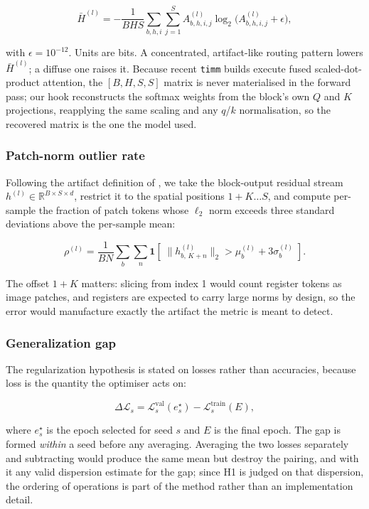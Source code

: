 \begin{equation}
\bar{H}^{(l)} = -\frac{1}{BHS}\sum_{b,h,i}\sum_{j=1}^{S} A^{(l)}_{b,h,i,j}\log_2\!\big(A^{(l)}_{b,h,i,j} + \epsilon\big),
\end{equation}

with $\epsilon = 10^{-12}$. Units are bits. A concentrated, artifact-like
routing pattern lowers $\bar{H}^{(l)}$; a diffuse one raises it. Because
recent \texttt{timm} builds execute fused scaled-dot-product attention, the
$[B,H,S,S]$ matrix is never materialised in the forward pass; our hook
reconstructs the softmax weights from the block's own $Q$ and $K$ projections,
reapplying the same scaling and any $q$/$k$ normalisation, so the recovered
matrix is the one the model used.

\subsubsection{Patch-norm outlier rate}
Following the artifact definition of \cite{darcet2024registers}, we take the
block-output residual stream $h^{(l)} \in \mathbb{R}^{B \times S \times d}$,
restrict it to the spatial positions $1+K \dots S$, and compute per-sample the
fraction of patch tokens whose $\ell_2$ norm exceeds three standard deviations
above the per-sample mean:

\begin{equation}
\rho^{(l)} = \frac{1}{BN}\sum_{b}\sum_{n} \mathbf{1}\!\left[\;\lVert h^{(l)}_{b,\,K+n}\rVert_2 > \mu^{(l)}_b + 3\sigma^{(l)}_b \;\right].
\end{equation}

The offset $1+K$ matters: slicing from index 1 would count register tokens as
image patches, and registers are expected to carry large norms by design, so
the error would manufacture exactly the artifact the metric is meant to detect.

\subsubsection{Generalization gap}
The regularization hypothesis is stated on losses rather than accuracies,
because loss is the quantity the optimiser acts on:

\begin{equation}
\Delta\mathcal{L}_s = \mathcal{L}^{\mathrm{val}}_{s}(e^{\star}_s) - \mathcal{L}^{\mathrm{train}}_{s}(E),
\end{equation}

where $e^{\star}_s$ is the epoch selected for seed $s$ and $E$ is the final
epoch. The gap is formed \emph{within} a seed before any averaging. Averaging
the two losses separately and subtracting would produce the same mean but
destroy the pairing, and with it any valid dispersion estimate for the gap;
since H1 is judged on that dispersion, the ordering of operations is part of
the method rather than an implementation detail.

